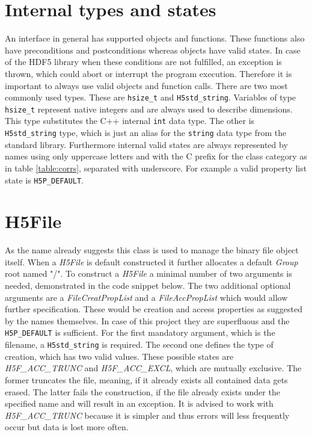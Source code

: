 \section{Internal types and states}
\label{seq:internaltypes}
An interface in general has supported objects and functions. These functions also have preconditions and postconditions whereas objects have valid states. In case of the HDF5 library when these conditions are not fulfilled, an exception is thrown, which could abort or interrupt the program execution. Therefore it is important to always use valid objects and function calls. There are two most commonly used types. These are \texttt{hsize\_t} and \texttt{H5std\_string}. Variables of type \texttt{hsize\_t} represent native integers and are always used to describe dimensions. This type substitutes the C++ internal \texttt{int} data type. The other is \texttt{H5std\_string} type, which is just an alias for the \texttt{string} data type from the standard library. Furthermore internal valid states are always represented by names using only uppercase letters and with the C prefix for the class category as in table \ref{table:corrs}, separated with underscore. For example a valid property list state is \texttt{H5P\_DEFAULT}.

\section{H5File}
\label{seq:h5file}
As the name already suggests this class is used to manage the binary file object itself. When a \textit{H5File} is default constructed it further allocates a default \textit{Group} root named "/". To construct a \textit{H5File} a minimal number of two arguments is needed, demonstrated in the code snippet below. The two additional optional arguments are a \textit{FileCreatPropList} and a \textit{FileAccPropList} which would allow further specification. These would be creation and access properties as suggested by the names themselves. In case of this project they are superfluous and the \texttt{H5P\_DEFAULT} is sufficient. For the first mandatory argument, which is the filename, a \texttt{H5std\_string} is required. The second one defines the type of creation, which has two valid values. These possible states are \textit{H5F\_ACC\_TRUNC} and \textit{H5F\_ACC\_EXCL}, which are mutually exclusive. The former truncates the file, meaning, if it already exists all contained data gets erased. The latter fails the construction, if the file already exists under the specified name and will result in an exception. It is advised to work with \textit{H5F\_ACC\_TRUNC} because it is simpler and thus errors will less frequently occur but data is lost more often.


